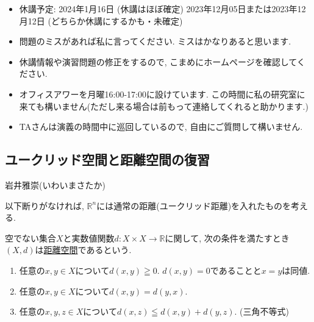 \documentclass[dvipdfmx,a4paper,11pt]{article}
\newcommand{\R}{\mathbb{R}}
\theoremstyle{definition}
\begin{document}
\vspace{11pt}
\begin{itemize}
  \setlength{\parskip}{0cm} %
  \setlength{\itemsep}{0cm} %
  \item 休講予定: 2024年1月16日 (休講はほぼ確定) 2023年12月05日または2023年12月12日 (どちらか休講にするかも・未確定)
    \item 問題のミスがあれば私に言ってください. ミスはかなりあると思います. 
  \item 休講情報や演習問題の修正をするので, こまめにホームページを確認してください.
    \item オフィスアワーを月曜16:00-17:00に設けています. この時間に私の研究室に来ても構いません(ただし来る場合は前もって連絡してくれると助かります.)
    \item TAさんは演義の時間中に巡回しているので, 自由にご質問して構いません. 
 \end{itemize}
 
\newpage

\begin{center}
\section{ユークリッド空間と距離空間の復習}
\label{sec-euc}
\end{center}
\begin{flushright}
 岩井雅崇(いわいまさたか)
\end{flushright}

以下断りがなければ, $\R^{n}$には通常の距離(ユークリッド距離)を入れたものを考える. 
\begin{tcolorbox}[
    colback = white,
    colframe = green!35!black,
    fonttitle = \bfseries,
    breakable = true]
    空でない集合$X$と実数値関数$d : X \times X \rightarrow \R$に関して, 次の条件を満たすとき$(X,d)$は\underline{距離空間}であるという.
    \begin{enumerate}
    \setlength{\parskip}{0cm} 
  \setlength{\itemsep}{0cm} 
    \item 任意の$x,y \in X$について$d(x,y) \geqq 0$. $d(x,y)=0$であることと$x=y$は同値. 
    \item 任意の$x,y \in X$について$d(x,y)=d(y,x)$.
    \item 任意の$x,y,z \in X$について$d(x,z) \leqq d(x,y) + d(y,z)$. (三角不等式)
    \end{enumerate}
 \end{tcolorbox}
 
\end{document}

